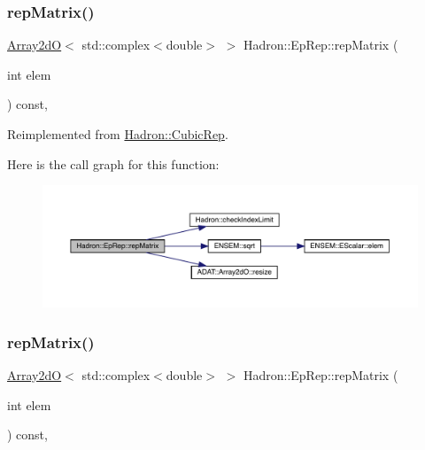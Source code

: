 \subsubsection{\texorpdfstring{repMatrix()}{repMatrix()}\hspace{0.1cm}{\footnotesize\ttfamily [1/3]}}
{\footnotesize\ttfamily \mbox{\hyperlink{classADAT_1_1Array2dO}{Array2dO}}$<$ std\+::complex$<$double$>$ $>$ Hadron\+::\+Ep\+Rep\+::rep\+Matrix (\begin{DoxyParamCaption}\item[{int}]{elem }\end{DoxyParamCaption}) const\hspace{0.3cm}{\ttfamily [inline]}, {\ttfamily [virtual]}}



Reimplemented from \mbox{\hyperlink{structHadron_1_1CubicRep_ac5d7e9e6f4ab1158b5fce3e4ad9e8005}{Hadron\+::\+Cubic\+Rep}}.

Here is the call graph for this function\+:
\nopagebreak
\begin{figure}[H]
\begin{center}
\leavevmode
\includegraphics[width=350pt]{d7/da2/structHadron_1_1EpRep_a51731663ac1ad2e9e41f7527b536e2b5_cgraph}
\end{center}
\end{figure}
\mbox{\label{structHadron_1_1EpRep_a51731663ac1ad2e9e41f7527b536e2b5}} 
\subsubsection{\texorpdfstring{repMatrix()}{repMatrix()}\hspace{0.1cm}{\footnotesize\ttfamily [2/3]}}
{\footnotesize\ttfamily \mbox{\hyperlink{classADAT_1_1Array2dO}{Array2dO}}$<$ std\+::complex$<$double$>$ $>$ Hadron\+::\+Ep\+Rep\+::rep\+Matrix (\begin{DoxyParamCaption}\item[{int}]{elem }\end{DoxyParamCaption}) const\hspace{0.3cm}{\ttfamily [inline]}, {\ttfamily [virtual]}}



